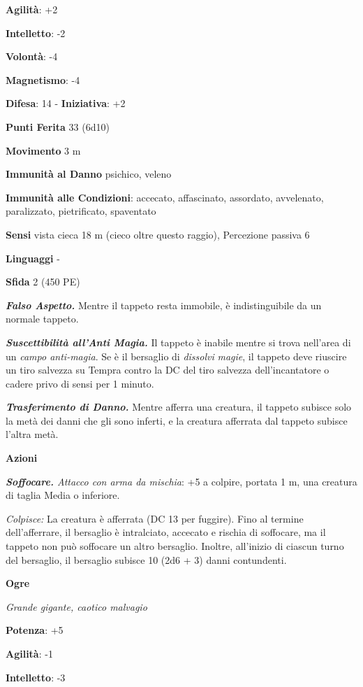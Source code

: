 \begin{multicols}{2}
\textbf{Agilità}: +2

\textbf{Intelletto}: -2

\textbf{Volontà}: -4

\textbf{Magnetismo}: -4

\textbf{Difesa}: 14 - \textbf{Iniziativa}: +2

\textbf{Punti Ferita} 33 (6d10)

\textbf{Movimento} 3 m

\textbf{Immunità al Danno} psichico, veleno

\textbf{Immunità alle Condizioni}: accecato, affascinato, assordato,
avvelenato, paralizzato, pietrificato, spaventato

\textbf{Sensi} vista cieca 18 m (cieco oltre questo raggio), Percezione
passiva 6

\textbf{Linguaggi} -

\textbf{Sfida} 2 (450 PE)\smallskip

\emph{\textbf{Falso Aspetto.}} Mentre il tappeto resta immobile, è
indistinguibile da un normale tappeto.

\emph{\textbf{Suscettibilità all'Anti Magia.}} Il tappeto è inabile
mentre si trova nell'area di un \emph{campo anti-magia}. Se è il
bersaglio di \emph{dissolvi} \emph{magie}, il tappeto deve riuscire un
tiro salvezza su Tempra contro la DC del tiro salvezza
dell'incantatore o cadere privo di sensi per 1 minuto.

\emph{\textbf{Trasferimento di Danno.}} Mentre afferra una creatura, il
tappeto subisce solo la metà dei danni che gli sono inferti, e la
creatura afferrata dal tappeto subisce l'altra metà.

\smallskip\textbf{Azioni}

\emph{\textbf{Soffocare.} Attacco con arma da mischia}: +5 a colpire,
portata 1 m, una creatura di taglia Media o inferiore.

\emph{Colpisce:} La creatura è afferrata (DC 13 per fuggire). Fino al
termine dell'afferrare, il bersaglio è intralciato, accecato e rischia
di soffocare, ma il tappeto non può soffocare un altro bersaglio.
Inoltre, all'inizio di ciascun turno del bersaglio, il bersaglio subisce
10 (2d6 + 3) danni contundenti.

\textbf{Ogre}

\emph{Grande gigante, caotico malvagio}

\textbf{Potenza}: +5

\textbf{Agilità}: -1

\textbf{Intelletto}: -3


\end{multicols}

